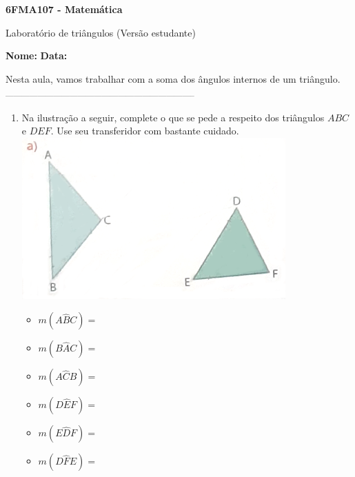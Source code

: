 \documentclass[a4paper,14pt]{article}
\begin{document}
	
	\noindent\textbf{6FMA107 - Matemática} 
	
	\begin{center}Laboratório de triângulos (Versão estudante)
	\end{center}
	
	\noindent\textbf{Nome:} \underline{\hspace{10cm}}
	\noindent\textbf{Data:} \underline{\hspace{4cm}}
	
	
	\begin{multicols}{2}
		\noindent Nesta aula, vamos trabalhar com a soma dos ângulos internos de um triângulo. \\
		\noindent\textsubscript{-----------------------------------------------------------------------}
		\begin{enumerate} 
			\item Na ilustração a seguir, complete o que se pede a respeito dos triângulos $ABC$ e $DEF$. Use seu transferidor com bastante cuidado.
			\includegraphics[width=1\linewidth]{6FMA107_imagens/imagem1}
			\begin{itemize}
				\item $m (A\hat{B}C) =$
				\item $m (B\hat{A}C) =$
				\item $m (A\hat{C}B) =$
				\item $m (D\hat{E}F) =$
				\item $m (E\hat{D}F) =$
				\item $m (D\hat{F}E) =$
			\end{itemize}

\end{enumerate}
\end{multicols}
\end{document}
